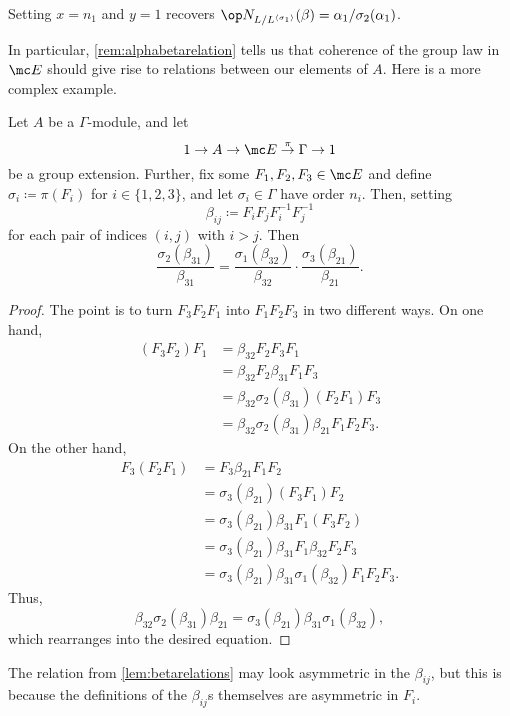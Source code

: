\documentclass{article}
\numberwithin{equation}{section}
\begin{document}
\begin{remark} \label{rem:alphabetarelation}
	Setting $x=n_1$ and $y=1$ recovers $\op N_{L/L^{\langle\sigma_1\rangle}}(\beta)=\alpha_1/\sigma_2(\alpha_1)$.
\end{remark}
In particular, \autoref{rem:alphabetarelation} tells us that coherence of the group law in $\mc E$ should give rise to relations between our elements of $A$. Here is a more complex example.
\begin{lemma} \label{lem:betarelations}
	Let $A$ be a $\Gamma$-module, and let 
	\[1\to A\to\mc E\stackrel\pi\to\Gamma\to1\]
	be a group extension. Further, fix some $F_1,F_2,F_3\in\mc E$ and define $\sigma_i\coloneqq\pi(F_i)$ for $i\in\{1,2,3\}$, and let $\sigma_i\in\Gamma$ have order $n_i$. Then, setting
	\[\beta_{ij}\coloneqq F_iF_jF_i^{-1}F_j^{-1}\]
	for each pair of indices $(i,j)$ with $i>j$. Then
	\[\frac{\sigma_2(\beta_{31})}{\beta_{31}}=\frac{\sigma_1(\beta_{32})}{\beta_{32}}\cdot\frac{\sigma_3(\beta_{21})}{\beta_{21}}.\]
\end{lemma}
\begin{proof}
	The point is to turn $F_3F_2F_1$ into $F_1F_2F_3$ in two different ways. On one hand,
	\begin{align*}
		(F_3F_2)F_1 &= \beta_{32}F_2F_3F_1 \\
		&= \beta_{32}F_2\beta_{31}F_1F_3 \\
		&= \beta_{32}\sigma_2(\beta_{31})(F_2F_1)F_3 \\
		&= \beta_{32}\sigma_2(\beta_{31})\beta_{21}F_1F_2F_3.
	\end{align*}
	On the other hand,
	\begin{align*}
		F_3(F_2F_1) &= F_3\beta_{21}F_1F_2 \\
		&= \sigma_3(\beta_{21})(F_3F_1)F_2 \\
		&= \sigma_3(\beta_{21})\beta_{31}F_1(F_3F_2) \\
		&= \sigma_3(\beta_{21})\beta_{31}F_1\beta_{32}F_2F_3 \\
		&= \sigma_3(\beta_{21})\beta_{31}\sigma_1(\beta_{32})F_1F_2F_3.
	\end{align*}
	Thus,
	\[\beta_{32}\sigma_2(\beta_{31})\beta_{21}=\sigma_3(\beta_{21})\beta_{31}\sigma_1(\beta_{32}),\]
	which rearranges into the desired equation.
\end{proof}
\begin{remark}
	The relation from \autoref{lem:betarelations} may look asymmetric in the $\beta_{ij}$, but this is because the definitions of the $\beta_{ij}$s themselves are asymmetric in $F_i$.
\end{remark}
\end{document}

